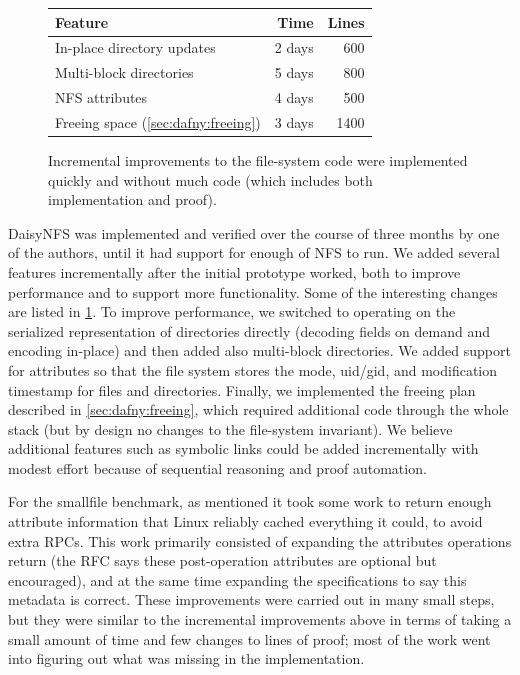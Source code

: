 \begin{figure}
\begin{center}
\begin{tabular}{lrr}
  \toprule
  \textbf{Feature} & \textbf{Time} & \textbf{Lines} \\
  \midrule
  In-place directory updates & 2 days & 600\\
  Multi-block directories & 5 days & 800 \\
  NFS attributes & 4 days & 500 \\
  Freeing space (\cref{sec:dafny:freeing}) & 3 days & 1400\\
  \bottomrule
\end{tabular}
\end{center}
\caption{Incremental improvements to the file-system code were implemented
  quickly and without much code (which includes both implementation and proof).}
\label{fig:features}
\end{figure}

DaisyNFS was implemented and verified over the course of three months by
one of the authors, until it had support for enough of NFS to run. We
added several features incrementally after the initial prototype
worked, both to improve performance and to support more
functionality. Some of the interesting changes are listed in
\cref{fig:features}.  To improve performance, we switched to
operating on the serialized representation of directories directly
(decoding fields on demand and encoding in-place) and then added also
multi-block directories.  We added support for attributes so that the file
system stores the mode, uid/gid, and modification timestamp for files and directories.
Finally, we implemented the freeing plan described
in \cref{sec:dafny:freeing}, which required additional code through the
whole stack (but by design no changes to the file-system invariant).
We believe additional features such as symbolic links
could be added incrementally with modest effort because
of sequential reasoning and proof automation.

For the smallfile benchmark, as mentioned it took some work to return enough
attribute information that Linux reliably cached everything it could, to avoid
extra RPCs. This work primarily consisted of expanding the attributes operations
return (the RFC says these post-operation attributes are optional but
encouraged), and at the same time expanding the specifications to say this
metadata is correct. These improvements were carried out in many small steps,
but they were similar to the incremental improvements above in terms of taking a
small amount of time and few changes to lines of proof; most of the work went
into figuring out what was missing in the implementation.

